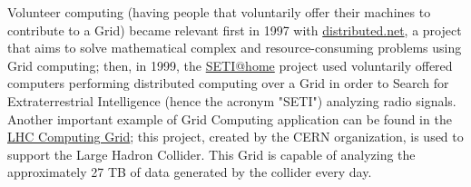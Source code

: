 Volunteer computing (having people that voluntarily offer their machines to contribute to a Grid) became relevant first in 1997 with \href{https://www.distributed.net/Main_Page}{distributed.net}, a project that aims to solve mathematical complex and resource-consuming problems using Grid computing; then, in 1999, the \href{https://setiathome.berkeley.edu/}{SETI@home} project used voluntarily offered computers performing distributed computing over a Grid in order to Search for Extraterrestrial Intelligence (hence the acronym "SETI") analyzing radio signals.
Another important example of Grid Computing application can be found in the \href{https://wlcg.web.cern.ch/}{LHC Computing Grid}; this project, created by the CERN organization, is used to support the Large Hadron Collider. This Grid is capable of analyzing the approximately 27 TB of data generated by the collider every day.
